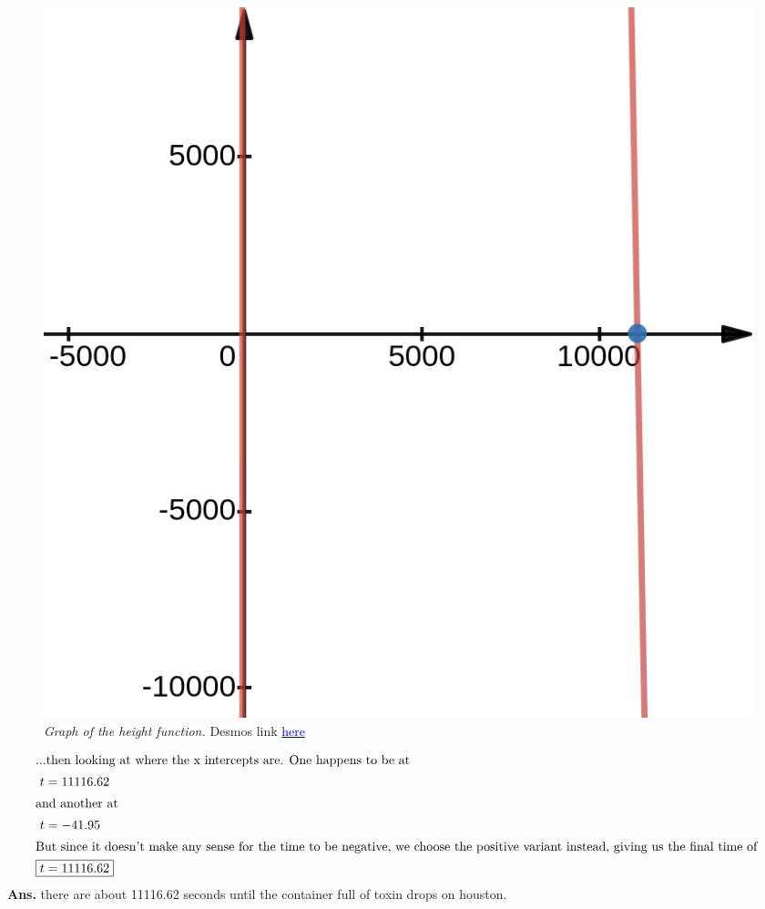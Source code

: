 \documentclass[12pt]{article}
\begin{document}
\begin{figure}[ht]
  \begin{center}
    \includegraphics[scale=.3]{disc-5-terminal-velocity-height-function.png}
    \caption{\textit{Graph of the height function.} Desmos link \href{https://www.desmos.com/calculator/cvnkkwav9r}{\textcolor{blue}{here}}}
  \end{center}
\end{figure}
\begin{align}
  \intertext{...then looking at where the x intercepts are. One happens to be at }
  t                       & =11116.62                                                                      \\
  \intertext{and another at}
  t & =-41.95 \\
  \intertext{But since it doesn't make any sense for the time to be negative, we choose the positive variant instead, giving us the final time of }
  \Aboxed{t & =11116.62}
\end{align}
\textbf{Ans.} there are about 11116.62 seconds until the container full of toxin drops on houston.
\end{document}
